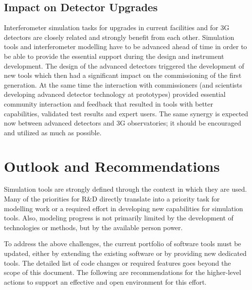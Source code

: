 \subsection{Impact on Detector Upgrades}
Interferometer simulation tasks for upgrades in current facilities and for \ac{3G}  detectors are closely related and strongly benefit from each other. Simulation tools and interferometer modelling have to be advanced ahead of time in order to be able to provide the essential
support during the design and instrument development. The design of the advanced detectors triggered the development of new tools which then had a significant impact on the commissioning of the first generation. At the same time the interaction with commissioners (and scientists developing advanced detector
technology at prototypes) provided essential community interaction and feedback that resulted in tools with better capabilities, validated test results and expert users. The same synergy is expected now between advanced detectors and \ac{3G}  observatories; it should be encouraged and utilized as much as possible.

\section{Outlook and Recommendations}
Simulation tools are strongly defined through the context in which they are used. Many of the priorities for R\&D directly translate into a priority task for modelling work or a required effort in developing new capabilities for simulation tools. Also, modeling progress is not primarily limited by the development of technologies or methods, but by the available person power.

To address the above challenges, the current portfolio of software tools must be updated, either by extending the existing software or by providing new dedicated tools. The detailed list of code changes or required features goes beyond the scope of this document. The following are recommendations for the higher-level actions to support an effective and open environment for this effort.

